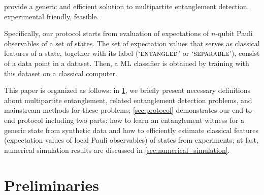 \documentclass[
aps,
pra,
twocolumn,
floatfix,
]{revtex4-2}
\theoremstyle{plain}
\theoremstyle{definition}
\newtheorem{notation}{Notation}
\newcommand{\ew}{W}
\newcommand{\ob}{O}
\newcommand{\dm}{\rho}
\newcommand{\entangled}{\textsc{entangled}}
\newcommand{\separable}{\textsc{separable}}
\newcommand{\hamiltonian}{\hat{H}}
\begin{document}
provide a generic and efficient solution to multipartite entanglement detection.
experimental friendly, feasible.

Specifically, our protocol starts from evaluation of expectations of $n$-qubit Pauli observables of a set of states. 
The set of expectation values that serves as classical features of a state, together with its label (`$\entangled$' or `$\separable$'), consist of a data point in a dataset.
Then, a ML classifier is obtained by training with this dataset on a classical computer.


This paper is organized as follows: in \cref{sec:preliminaries}, we briefly present necessary definitions about multipartite entanglement, related entanglement detection problems, and mainstream methods for these problems;
\cref{sec:protocol} demonstrates our end-to-end protocol including two parts: how to learn an entanglement witness for a generic state from synthetic data and how to efficiently estimate classical features (expectation values of local Pauli observables) of states from experiments;
at last, numerical simulation results are discussed in \cref{sec:numerical_simulation}.

\section{Preliminaries}\label{sec:preliminaries}
\end{document}
